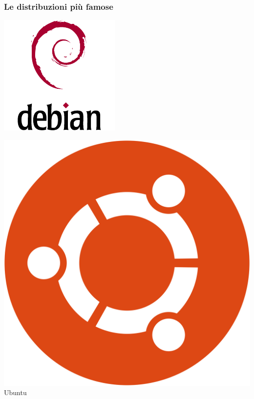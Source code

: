 \documentclass{beamer}
\begin{document}
\begin{frame}
    \frametitle{Le distribuzioni più famose}

    \begin{minipage}[b][.35\textheight][t]{.3\textwidth}
    \includegraphics[width=.7\textwidth]{img/logo-debian.pdf}\\
    \end{minipage}\hfill
    \begin{minipage}[b][.35\textheight][t]{.3\textwidth}
    \includegraphics[width=.7\textwidth]{img/logo-ubuntu.png}\\
    \centering
    Ubuntu
    \end{minipage}\hfill
    \begin{minipage}[b][.35\textheight][t]{.3\textwidth}

\end{minipage}
\end{frame}
\end{document}
